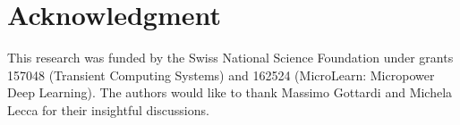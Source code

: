 \documentclass[journal]{IEEEtran}
\begin{document}
\section*{Acknowledgment}
This research was funded by the Swiss National Science Foundation under grants 157048 (Transient Computing Systems) and 162524 (MicroLearn: Micropower Deep Learning). The authors would like to thank Massimo Gottardi and Michela Lecca for their insightful discussions.




\ifCLASSOPTIONcaptionsoff
  \newpage
\fi







%
%
%

% 
\end{document}
